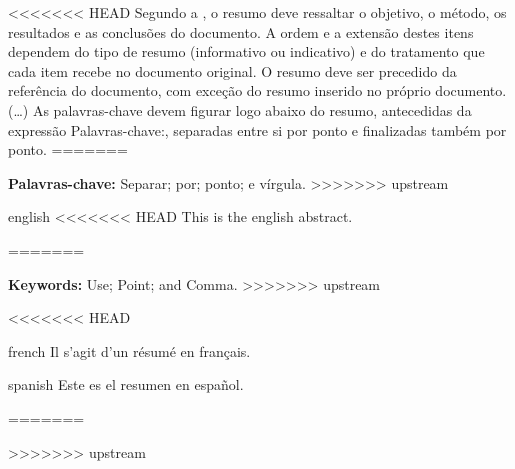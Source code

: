 \setlength{\absparsep}{18pt} %
\begin{resumo}
<<<<<<< HEAD
 Segundo a \cite[3.1-3.2]{NBR6028:2003}, o resumo deve ressaltar o
 objetivo, o método, os resultados e as conclusões do documento. A ordem e a extensão
 destes itens dependem do tipo de resumo (informativo ou indicativo) e do
 tratamento que cada item recebe no documento original. O resumo deve ser
 precedido da referência do documento, com exceção do resumo inserido no
 próprio documento. (\ldots) As palavras-chave devem figurar logo abaixo do
 resumo, antecedidas da expressão Palavras-chave:, separadas entre si por
 ponto e finalizadas também por ponto.
=======

\textbf{Palavras-chave:} Separar; por; ponto; e vírgula. 
>>>>>>> upstream

\end{resumo}

\begin{resumo}[Abstract]
 \begin{otherlanguage*}{english}
<<<<<<< HEAD
   This is the english abstract.

=======
   
\textbf{Keywords:} Use; Point; and Comma.
>>>>>>> upstream
   \vspace{\onelineskip}
 
   \noindent 
 \end{otherlanguage*}
\end{resumo}

<<<<<<< HEAD
\begin{resumo}[Résumé]
 \begin{otherlanguage*}{french}
    Il s'agit d'un résumé en français.
 
 \end{otherlanguage*}
\end{resumo}

\begin{resumo}[Resumen]
 \begin{otherlanguage*}{spanish}
   Este es el resumen en español.
  
 \end{otherlanguage*}
\end{resumo}
=======

>>>>>>> upstream
